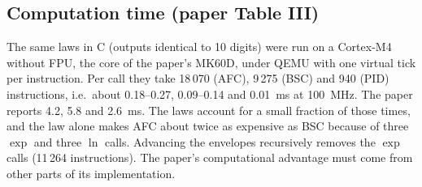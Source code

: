 \documentclass[10pt,a4paper]{article}
\begin{document}
\subsection{Computation time (paper Table III)}
The same laws in C (outputs identical to 10 digits) were run on a Cortex-M4 without FPU, the core of the paper's MK60D, under QEMU with one virtual tick per instruction. Per call they take 18\,070 (AFC), 9\,275 (BSC) and 940 (PID) instructions, i.e.\ about 0.18--0.27, 0.09--0.14 and \SI{0.01}{ms} at \SI{100}{MHz}. The paper reports 4.2, 5.8 and \SI{2.6}{ms}. The laws account for a small fraction of those times, and the law alone makes AFC about twice as expensive as BSC because of three \(\exp\) and three \(\ln\) calls. Advancing the envelopes recursively removes the \(\exp\) calls (11\,264 instructions). The paper's computational advantage must come from other parts of its implementation.
\end{document}

